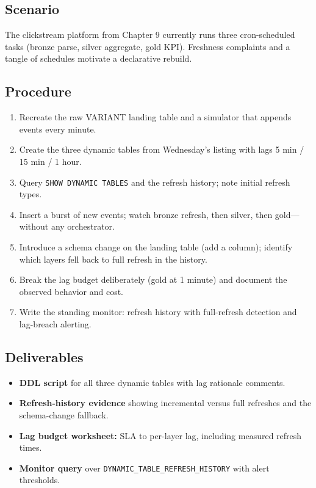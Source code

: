 \subsection*{Scenario}
The clickstream platform from Chapter 9 currently runs three cron-scheduled tasks (bronze parse, silver aggregate, gold KPI). Freshness complaints and a tangle of schedules motivate a declarative rebuild.

\subsection*{Procedure}
\begin{enumerate}
    \item Recreate the raw VARIANT landing table and a simulator that appends events every minute.
    \item Create the three dynamic tables from Wednesday's listing with lags 5 min / 15 min / 1 hour.
    \item Query \texttt{SHOW DYNAMIC TABLES} and the refresh history; note initial refresh types.
    \item Insert a burst of new events; watch bronze refresh, then silver, then gold---without any orchestrator.
    \item Introduce a schema change on the landing table (add a column); identify which layers fell back to full refresh in the history.
    \item Break the lag budget deliberately (gold at 1 minute) and document the observed behavior and cost.
    \item Write the standing monitor: refresh history with full-refresh detection and lag-breach alerting.
\end{enumerate}

\subsection*{Deliverables}
\begin{itemize}
    \item \textbf{DDL script} for all three dynamic tables with lag rationale comments.
    \item \textbf{Refresh-history evidence} showing incremental versus full refreshes and the schema-change fallback.
    \item \textbf{Lag budget worksheet:} SLA to per-layer lag, including measured refresh times.
    \item \textbf{Monitor query} over \texttt{DYNAMIC\_TABLE\_REFRESH\_HISTORY} with alert thresholds.
\end{itemize}

